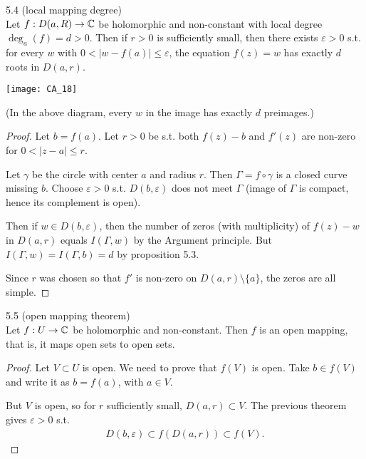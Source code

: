 \documentclass[a4paper]{article}
\begin{document}
\begin{thm} 5.4 (local mapping degree)\\
Let $f:D(a,R) \to \mathbb{C}$ be holomorphic and non-constant with local degree $\deg_a (f) = d>0$. Then if $r>0$ is sufficiently small, then there exists $\varepsilon>0$ s.t. for every $w$ with $0<|w-f(a)| \leq \varepsilon$, the equation $f(z) =w$ has exactly $d$ roots in $D(a,r)$.

\texttt{[image: CA\_18]}

(In the above diagram, every $w$ in the image has exactly $d$ preimages.)

\begin{proof}
Let $b=f(a)$. Let $r>0$ be s.t. both $f(z)-b$ and $f'(z)$ are non-zero for $0<|z-a|\leq r$.

Let $\gamma$ be the circle with center $a$ and radius $r$. Then $\Gamma=f\circ \gamma$ is a closed curve missing $b$. Choose $\varepsilon>0$ s.t. $D(b,\varepsilon)$ does not meet $\Gamma$ (image of $\Gamma$ is compact, hence its complement is open).

Then if $w \in D(b,\varepsilon)$, then the number of zeros (with multiplicity) of $f(z)-w$ in $D(a,r)$ equals $I(\Gamma,w)$ by the Argument principle. But $I(\Gamma,w) = I(\Gamma,b) = d$ by proposition 5.3.

Since $r$ was chosen so that $f'$ is non-zero on $D(a,r) \setminus \{a\}$, the zeros are all simple.
\end{proof}
\end{thm}

\begin{coro} 5.5 (open mapping theorem)\\
Let $f:U \to \mathbb{C}$ be holomorphic and non-constant. Then $f$ is an open mapping, that is, it maps open sets to open sets.
\begin{proof}
Let $V \subset U$ is open. We need to prove that $f(V)$ is open. Take $b \in f(V)$ and write it as $b=f(a)$, with $a \in V$.

But $V$ is open, so for $r$ sufficiently small, $D(a,r) \subset V$. The previous theorem gives $\varepsilon>0$ s.t.
\begin{equation*}
\begin{aligned}
D(b,\varepsilon) \subset f(D(a,r)) \subset f(V).
\end{aligned}
\end{equation*}
\end{proof}
\end{coro}
\end{document}
